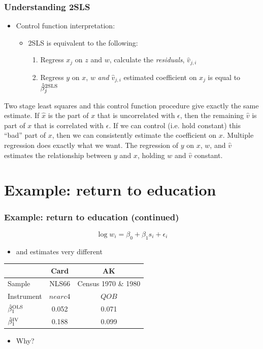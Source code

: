 \begin{frame}[allowframebreaks]\frametitle{Understanding 2SLS} 
  \begin{itemize}
  \item Control function interpretation:
    \begin{itemize}
    \item 2SLS is equivalent to the following:
      \begin{enumerate}
      \item Regress $x_j$ on $z$ and $w$, calculate the
        \emph{residuals}, $\hat{v}_{j,i}$
      \item Regress $y$ on $x$, $w$ \emph{and} $\hat{v}_{j,i}$
        estimated coefficient on $x_j$ is equal to ${\hat{\beta}^{\mathrm{2SLS}}}_j$
      \end{enumerate}
    \end{itemize}
  \end{itemize}
\end{frame}

Two stage least squares and this control function procedure give
exactly the same estimate. If $\hat{x}$ is the part of $x$ that is
uncorrelated with $\epsilon$, then the remaining $\hat{v}$ is part of
$x$ that is correlated with $\epsilon$. If we can control (i.e. hold
constant) this ``bad'' part of $x$, then we can consistently estimate
the coefficient on $x$. Multiple regression does exactly what we
want. The regression of $y$ on $x$, $w$, and $\hat{v}$ estimates the
relationship between $y$ and $x$, holding $w$ and $\hat{v}$ constant. 



\section{Example: return to education}

\begin{frame}[allowframebreaks]
  \frametitle{Example: return to education (continued)}
    \[ \log w_i = \beta_0 + \beta_1 s_i + \epsilon_i \]

  \begin{itemize}
  \item \cite{card1993} and \cite{angrist1991} estimates very different   
  \end{itemize}
  \begin{center}
    \begin{tabular}{l|cc}  & {\textbf{Card}} &
      {\textbf{AK}} \\
      \hline
      Sample & NLS66 & Census 1970 \& 1980 \\
      Instrument & $nearc4$ & $QOB$ \\
      ${\hat{\beta}^{\mathrm{OLS}}}_1$ & 0.052 & 0.071 \\
      ${\hat{\beta}^{\mathrm{IV}}}_1$ & 0.188 & 0.099 \\ \hline
    \end{tabular}
  \end{center}
  \begin{itemize}
  \item Why?
  \end{itemize}
\end{frame}

